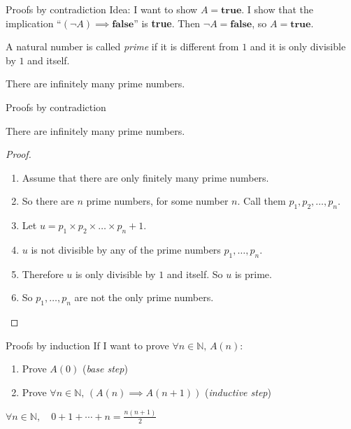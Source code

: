 \documentclass[11pt]{beamer}
\theoremstyle{definition}
\begin{document}
\begin{frame}{Proofs by contradiction}
  Idea: I want to show $A=\textbf{true}$. I show that the implication
  ``$(\neg A)\implies\textbf{false}$'' is \textbf{true}.
  Then $\neg A=\textbf{false}$, so $A=\textbf{true}$.
  \pause
\begin{definition}
  A natural number is called \emph{prime} if it is different from $1$ and it
  is only divisible by $1$ and itself.
\end{definition}
  \begin{theorem}
    There are infinitely many prime numbers.
  \end{theorem}

\end{frame}

\begin{frame}{Proofs by contradiction}
  \begin{theorem}
    There are infinitely many prime numbers.
  \end{theorem}
  \pause
  \begin{proof}
    \begin{enumerate}
    \item Assume that there are only finitely many prime numbers.
    \pause
    \item So there are $n$ prime numbers, for some number $n$.
          Call them $p_1,p_2,\dots,p_n$.
    \pause
    \item Let $u=p_1\times p_2\times \dots \times p_n +1$.
    \pause
    \item $u$ is not divisible by any of the prime numbers $p_1,\dots,p_n$.
    \pause
    \item Therefore $u$ is only divisible by $1$ and itself. So $u$ is prime.
    \pause
    \item So $p_1,\dots,p_n$ are not the only prime numbers.
    \end{enumerate}
  \end{proof}

\end{frame}



\begin{frame}{Proofs by induction}
  If I want to prove $\forall n\in \mathbb N,\, A(n)$:
  \begin{enumerate}
    \item Prove $A(0)$ (\emph{base step})
    \item Prove $\forall n\in \mathbb N,\, (A(n)\implies A(n+1))$
    (\emph{inductive step})
  \end{enumerate}
  \pause
  \begin{theorem}
    $\forall n\in \mathbb N,\quad 0+1+\cdots + n=\frac{n(n+1)}{2}$
  \end{theorem}

\end{frame}
\end{document}

